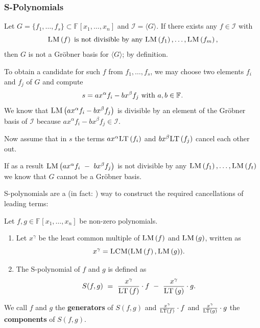 \documentclass[9pt]{beamer}
\newcommand{\memph}[1]{{\color{yellow9}{\bf #1}}\xspace}
\newcommand{\F}[1][]{\ensuremath{\mathbb{F}_{#1}}\xspace}
\newcommand{\I}{\ensuremath{\mathcal{I}}\xspace}
\newcommand{\gens}{\ensuremath{x_1,\dots,x_{n}}\xspace}
\newcommand{\LM}[1]{\ensuremath{\textsc{LM}\left(#1\right)}\xspace}
\newcommand{\LT}[1]{\ensuremath{\textsc{LT}\left(#1\right)}\xspace}
\newcommand{\LCM}[1]{\ensuremath{\textsc{LCM}(#1)\xspace}}
\newcommand{\ideal}[1]{\ensuremath{\langle #1\rangle}\xspace}
\begin{document}
\begin{frame}
\frametitle{S-Polynomials}

Let $G = \{f_1,\dots,f_s\} \subset \F{}[\gens]$ and $\I = \ideal{G}$. If there exists any $f \in \I$ with $$\LM{f} \textnormal{ is not divisible by any } \LM{f_1}, \dots,\LM{f_m},$$ then $G$ is not a Gröbner basis for $\ideal{G}$; by definition.

\framebreak

To obtain a candidate for such $f$ from $f_1,\dots,f_s$, we may choose two elements $f_i$ and $f_j$ of $G$ and compute \[s = ax^\alpha f_i - bx^\beta f_j \textnormal{ with } a,b \in \F{}.\]
We know that $\LM{ax^\alpha f_i - bx^\beta f_j}$ is divisible by an element of the Gröbner basis of $\I$ because $ax^\alpha f_i - bx^\beta f_j \in \I$. 

\framebreak

Now assume that in $s$ the terms $ax^\alpha\LT{f_i}$ and $bx^\beta\LT{f_j}$ cancel each other out. 

\vspace{1em}

If as a result $\LM{ax^\alpha f_i\ -\ bx^\beta f_j}$ is not divisible by any $ \LM{f_1}, \dots ,\LM{f_t}$ we know that $G$ cannot be a Gröbner basis. 

\framebreak

S-polynomials are a (in fact: \memph{the}) way to construct the required cancellations of leading terms:


\begin{definition}[S-Polynomial]
\label{def:spolynomials}
Let $f,g \in \F{}[\gens]$ be non-zero polynomials.
\begin{enumerate}
\item Let $x^\gamma$ be the least common multiple of $\LM{f}$ and $\LM{g}$, written as $$x^\gamma = \LCM{\LM{f},\LM{g}}.$$  
\item The S-polynomial of $f$ and $g$ is defined as
\begin{align*}
S(f,g)\ =\ \frac{x^\gamma}{\LT{f}}\cdot f\ -\
\frac{x^\gamma}{\LT{g}}\cdot g.
\end{align*}
\end{enumerate}
We call $f$ and $g$ the \textbf{generators} of $S(f,g)$ and $\frac{x^\gamma}{\LT{f}}\cdot f$  and $\frac{x^\gamma}{\LT{g}}\cdot g$ the \textbf{components} of $S(f,g)$.
\end{definition}

\framebreak


\end{frame}
\end{document}
